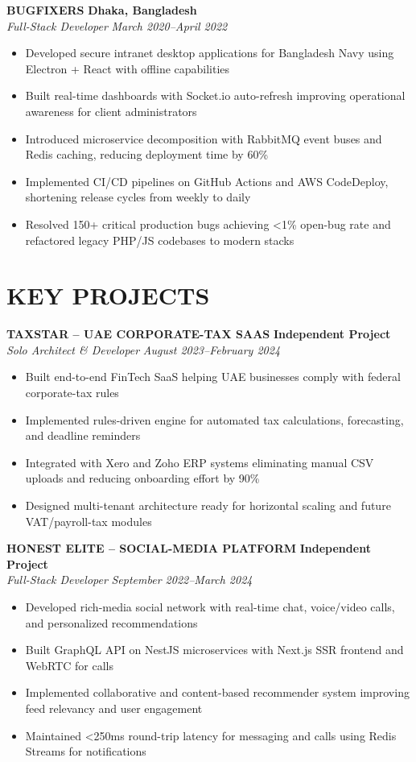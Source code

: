 \documentclass[11pt,letterpaper]{article}
\newcommand{\role}[4]{
  \begin{center}
  \textbf{#1} \hfill \textbf{#2} \\
  \textit{#3} \hfill \textit{#4}
  \end{center}
}
\begin{document}
\role{BUGFIXERS}{Dhaka, Bangladesh}{Full-Stack Developer}{March 2020--April 2022}
\begin{itemize}[leftmargin=*,nosep,topsep=0pt]
  \item Developed secure intranet desktop applications for Bangladesh Navy using Electron + React with offline capabilities
  \item Built real-time dashboards with Socket.io auto-refresh improving operational awareness for client administrators
  \item Introduced microservice decomposition with RabbitMQ event buses and Redis caching, reducing deployment time by 60\%
  \item Implemented CI/CD pipelines on GitHub Actions and AWS CodeDeploy, shortening release cycles from weekly to daily
  \item Resolved 150+ critical production bugs achieving <1\% open-bug rate and refactored legacy PHP/JS codebases to modern stacks
\end{itemize}

\vspace{1em}
\section{KEY PROJECTS}

\vspace{0.5em}
\role{TAXSTAR -- UAE CORPORATE-TAX SAAS}{Independent Project}{Solo Architect \& Developer}{August 2023--February 2024}
\begin{itemize}[leftmargin=*,nosep,topsep=0pt]
  \item Built end-to-end FinTech SaaS helping UAE businesses comply with federal corporate-tax rules
  \item Implemented rules-driven engine for automated tax calculations, forecasting, and deadline reminders
  \item Integrated with Xero and Zoho ERP systems eliminating manual CSV uploads and reducing onboarding effort by 90\%
  \item Designed multi-tenant architecture ready for horizontal scaling and future VAT/payroll-tax modules
\end{itemize}

\role{HONEST ELITE -- SOCIAL-MEDIA PLATFORM}{Independent Project}{Full-Stack Developer}{September 2022--March 2024}
\begin{itemize}[leftmargin=*,nosep,topsep=0pt]
  \item Developed rich-media social network with real-time chat, voice/video calls, and personalized recommendations
  \item Built GraphQL API on NestJS microservices with Next.js SSR frontend and WebRTC for calls
  \item Implemented collaborative and content-based recommender system improving feed relevancy and user engagement
  \item Maintained <250ms round-trip latency for messaging and calls using Redis Streams for notifications
\end{itemize}
\end{document}
